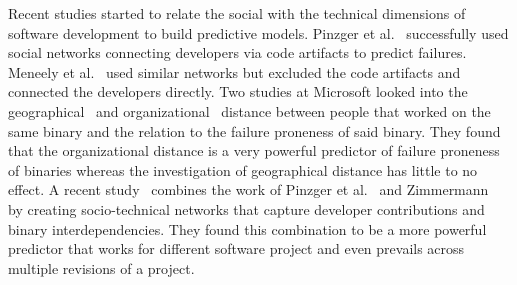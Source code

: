 Recent studies started to relate the social with the technical
dimensions of software development to build predictive models. Pinzger et
al.~\cite{pinzger:fse:2008} successfully used social networks connecting
developers via code artifacts to predict failures. Meneely et
al.~\cite{meneely:fse:2008} used similar networks but excluded the code artifacts
and connected the developers directly. Two studies at Microsoft looked into the
geographical~\cite{bird:acm:2009} and organizational~\cite{nagappan:icse:2008}
distance between people that worked on the same binary and the relation to the
failure proneness of said binary. They found that the organizational distance is
a very powerful predictor of failure proneness of binaries whereas the
investigation of geographical distance has little to no effect. A recent
study~\cite{bird:issre:2009} combines the work of Pinzger et
al.~\cite{pinzger:fse:2008} and
Zimmermann~\cite{zimmermann:icse:2008} by creating
socio-technical networks that capture developer contributions and binary
interdependencies. They found this combination to be a more powerful predictor
that works for different software project and even prevails across multiple
revisions of a project.
























